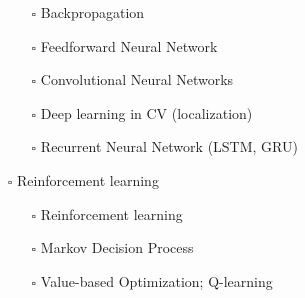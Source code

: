 \documentclass[11pt]{article}
\begin{document}
\begin{itemize}
\begin{itemize}
\item[{$\square$}] Backpropagation
\item[{$\square$}] Feedforward Neural Network
\item[{$\square$}] Convolutional Neural Networks
\item[{$\square$}] Deep learning in CV (localization)
\item[{$\square$}] Recurrent Neural Network (LSTM, GRU)
\end{itemize}
\item[{$\square$}] Reinforcement learning
\begin{itemize}
\item[{$\square$}] Reinforcement learning
\item[{$\square$}] Markov Decision Process
\item[{$\square$}] Value-based Optimization; Q-learning
\end{itemize}
\end{itemize}
\end{document}
